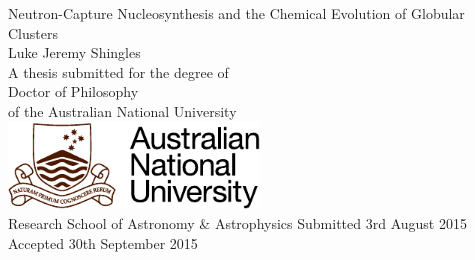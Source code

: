 \documentclass[a4paper,11pt,openright]{report}
\makeatletter
\newcommand{\thesistitle}{Neutron-Capture Nucleosynthesis and the Chemical Evolution of Globular Clusters}
\newcommand{\fullname}{Luke Jeremy Shingles}
\newcommand{\thesisdate}{3rd August 2015} %
\newcommand{\resubmissiondate}{30th September 2015}
\def\cleardoublepage{\clearpage\if@twoside \ifodd\c@page\else
	\hbox{}
	\vspace*{\fill}
	\thispagestyle{empty}
	\newpage
	\if@twocolumn\hbox{}\newpage\fi\fi\fi}
\makeatother
\begin{document}

\setlength{\epigraphwidth}{10cm}
\setlength{\afterepigraphskip}{1.5cm}
\renewcommand{\epigraphsize}{\small}
\renewcommand{\epigraphrule}{0pt}
\renewcommand{\epigraphflush}{center}
\renewcommand{\textflush}{flushleft}
\pagestyle{empty}

%
%
%
%
\begin{titlepage}\selectfont
  \begin{center}
  \phantom{}
  \vspace{0cm}
    \huge{\thesistitle}
    \\[2.5cm]
    \huge{\fullname}
    \\[2.5cm]
    \LARGE{A thesis submitted for the degree of}\\[0.5cm]
      \LARGE{Doctor of Philosophy}\\[0.5cm]
      \LARGE{of the Australian National University}
    \\[3.cm]
     \includegraphics[width=0.5\textwidth]{anu-logo-colour}
     \\[10mm]
        \LARGE{Research School of Astronomy \& Astrophysics}
        \vfill
        \Large{Submitted \thesisdate}\\[1mm]
        \Large{Accepted \resubmissiondate}
  \end{center}
\end{titlepage}
\restoregeometry


\setlength{\parskip}{2.5ex plus 0.5ex minus 0.3ex}

\end{document}
